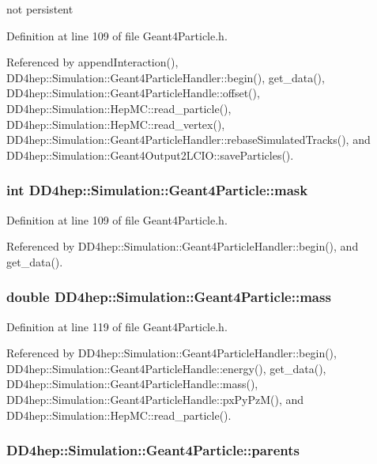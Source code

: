 not persistent 

Definition at line 109 of file Geant4Particle.h.

Referenced by appendInteraction(), DD4hep::Simulation::Geant4ParticleHandler::begin(), get\_\-data(), DD4hep::Simulation::Geant4ParticleHandle::offset(), DD4hep::Simulation::HepMC::read\_\-particle(), DD4hep::Simulation::HepMC::read\_\-vertex(), DD4hep::Simulation::Geant4ParticleHandler::rebaseSimulatedTracks(), and DD4hep::Simulation::Geant4Output2LCIO::saveParticles().\hypertarget{class_d_d4hep_1_1_simulation_1_1_geant4_particle_a907e9a43cf268196ff3b3e9e1be52b57}{
\subsubsection[{mask}]{\setlength{\rightskip}{0pt plus 5cm}int {\bf DD4hep::Simulation::Geant4Particle::mask}}}
\label{class_d_d4hep_1_1_simulation_1_1_geant4_particle_a907e9a43cf268196ff3b3e9e1be52b57}


Definition at line 109 of file Geant4Particle.h.

Referenced by DD4hep::Simulation::Geant4ParticleHandler::begin(), and get\_\-data().\hypertarget{class_d_d4hep_1_1_simulation_1_1_geant4_particle_aeb13e47e5c91dcfbfac27f41552b8298}{
\subsubsection[{mass}]{\setlength{\rightskip}{0pt plus 5cm}double {\bf DD4hep::Simulation::Geant4Particle::mass}}}
\label{class_d_d4hep_1_1_simulation_1_1_geant4_particle_aeb13e47e5c91dcfbfac27f41552b8298}


Definition at line 119 of file Geant4Particle.h.

Referenced by DD4hep::Simulation::Geant4ParticleHandler::begin(), DD4hep::Simulation::Geant4ParticleHandle::energy(), get\_\-data(), DD4hep::Simulation::Geant4ParticleHandle::mass(), DD4hep::Simulation::Geant4ParticleHandle::pxPyPzM(), and DD4hep::Simulation::HepMC::read\_\-particle().\hypertarget{class_d_d4hep_1_1_simulation_1_1_geant4_particle_a78909a136dade0e85770a6e0edb3bdad}{
\subsubsection[{parents}]{ {\bf DD4hep::Simulation::Geant4Particle::parents}}}
\label{class_d_d4hep_1_1_simulation_1_1_geant4_particle_a78909a136dade0e85770a6e0edb3bdad}


